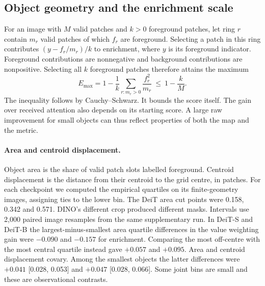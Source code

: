 \begin{center}\begin{minipage}{\linewidth}
\centering\footnotesize\setlength{\tabcolsep}{3pt}

\end{minipage}\end{center}
\subsection{Object geometry and the enrichment scale}
For an image with $M$ valid patches and $k>0$ foreground patches, let ring $r$ contain $m_r$ valid patches of which $f_r$ are foreground. Selecting a patch in this ring contributes $(y-f_r/m_r)/k$ to enrichment, where $y$ is its foreground indicator. Foreground contributions are nonnegative and background contributions are nonpositive. Selecting all $k$ foreground patches therefore attains the maximum
\[
 E_{\max}=1-\frac{1}{k}\sum_{r:m_r>0}\frac{f_r^2}{m_r}\ \le\ 1-\frac{k}{M}.
\]
The inequality follows by Cauchy--Schwarz. It bounds the score itself. The gain over received attention also depends on its starting score. A large raw improvement for small objects can thus reflect properties of both the map and the metric.
\paragraph{Area and centroid displacement.} Object area is the share of valid patch slots labelled foreground. Centroid displacement is the distance from their centroid to the grid centre, in patches. For each checkpoint we computed the empirical quartiles on its finite-geometry images, assigning ties to the lower bin. The DeiT area cut points were 0.158, 0.342 and 0.571. DINO's different crop produced different masks. Intervals use 2,000 paired image resamples from the same supplementary run. In DeiT-S and DeiT-B the largest-minus-smallest area quartile differences in the value weighting gain were $-0.090$ and $-0.157$ for enrichment. Comparing the most off-centre with the most central quartile instead gave $+0.057$ and $+0.095$. Area and centroid displacement covary. Among the smallest objects the latter differences were $+0.041$ [0.028, 0.053] and $+0.047$ [0.028, 0.066]. Some joint bins are small and these are observational contrasts.

